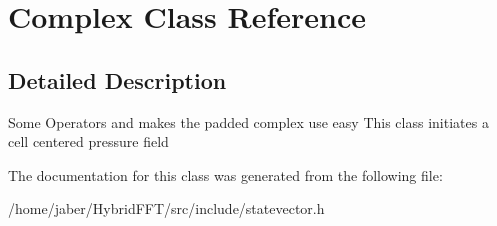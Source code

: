 \hypertarget{classComplex}{}\section{Complex Class Reference}
\label{classComplex}


\subsection{Detailed Description}
Some Operators and makes the padded complex use easy This class initiates a cell centered pressure field 

The documentation for this class was generated from the following file\+:\begin{DoxyCompactItemize}
\item 
/home/jaber/\+Hybrid\+F\+F\+T/src/include/statevector.\+h\end{DoxyCompactItemize}
